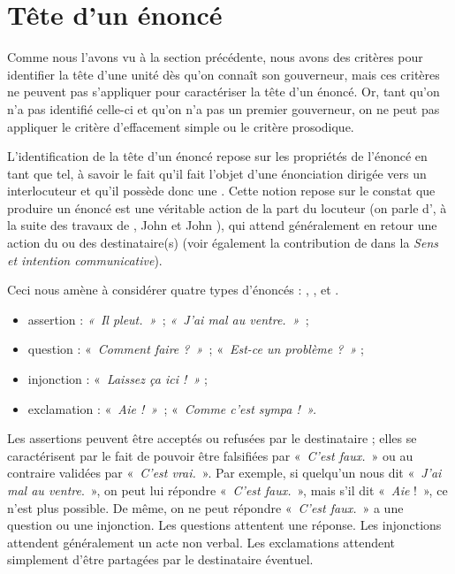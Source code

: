 \section{Tête d’un énoncé}\label{sec:3.3.8}

Comme nous l’avons vu à la section précédente, nous avons des critères pour identifier la tête d’une unité dès qu’on connaît son gouverneur, mais ces critères ne peuvent pas s’appliquer pour caractériser la tête d’un énoncé. Or, tant qu’on n’a pas identifié celle-ci et qu’on n’a pas un premier gouverneur, on ne peut pas appliquer le critère d’effacement simple ou le critère prosodique.

L’identification de la tête d’un énoncé repose sur les propriétés de l’énoncé en tant que tel, à savoir le fait qu’il fait l’objet d’une énonciation dirigée vers un interlocuteur et qu’il possède donc une . Cette notion repose sur le constat que produire un énoncé est une véritable action de la part du locuteur (on parle d’, à la suite des travaux de \citet{Gardiner1932}, John \citet{Austin1962} et John \citet{Searle1969}), qui attend généralement en retour une action du ou des destinataire(s) (voir également la contribution de \citet{Bloomfield1933} dans la  \textit{Sens et intention communicative}).

Ceci nous amène à considérer quatre types d’énoncés : , ,  et .

\begin{itemize}
\item assertion : \textit{«~Il pleut.~»~}; \textit{«~J’ai mal au ventre.~»~};
\item question : «~\textit{Comment faire ?~»~}; «~\textit{Est-ce un problème ?~»} ;
\item injonction : «~\textit{Laissez ça ici !~»} ;
\item exclamation : «~\textit{Aie !~»~}; «~\textit{Comme c’est sympa !~».}
\end{itemize}

Les assertions peuvent être acceptés ou refusées par le destinataire ; elles se caractérisent par le fait de pouvoir être falsifiées par «~\textit{C’est faux.}~» ou au contraire validées par «~\textit{C’est vrai.}~». Par exemple, si quelqu’un nous dit «~\textit{J’ai mal au ventre}.~», on peut lui répondre «~\textit{C’est faux.}~», mais s’il dit «~\textit{Aie} !~», ce n’est plus possible. De même, on ne peut répondre «~\textit{C’est faux.}~» a une question ou une injonction. Les questions attentent une réponse. Les injonctions attendent généralement un acte non verbal. Les exclamations attendent simplement d’être partagées par le destinataire éventuel.

